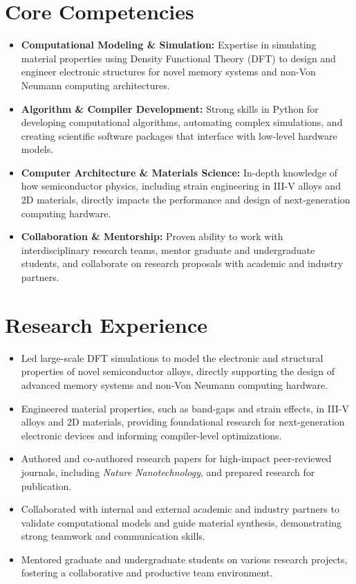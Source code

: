 \documentclass[letter,11pt]{article}
\begin{document}
\section{Core Competencies}
\begin{itemize}
    \item \textbf{Computational Modeling \& Simulation:} Expertise in simulating material properties using Density Functional Theory (DFT) to design and engineer electronic structures for novel memory systems and non-Von Neumann computing architectures.
    \item \textbf{Algorithm \& Compiler Development:} Strong skills in Python for developing computational algorithms, automating complex simulations, and creating scientific software packages that interface with low-level hardware models.
    \item \textbf{Computer Architecture \& Materials Science:} In-depth knowledge of how semiconductor physics, including strain engineering in III-V alloys and 2D materials, directly impacts the performance and design of next-generation computing hardware.
    \item \textbf{Collaboration \& Mentorship:} Proven ability to work with interdisciplinary research teams, mentor graduate and undergraduate students, and collaborate on research proposals with academic and industry partners.
\end{itemize}

\section{Research Experience}
\begin{itemize}
    \item Led large-scale DFT simulations to model the electronic and structural properties of novel semiconductor alloys, directly supporting the design of advanced memory systems and non-Von Neumann computing hardware.
    \item Engineered material properties, such as band-gaps and strain effects, in III-V alloys and 2D materials, providing foundational research for next-generation electronic devices and informing compiler-level optimizations.
    \item Authored and co-authored research papers for high-impact peer-reviewed journals, including \textit{Nature Nanotechnology}, and prepared research for publication.
    \item Collaborated with internal and external academic and industry partners to validate computational models and guide material synthesis, demonstrating strong teamwork and communication skills.
    \item Mentored graduate and undergraduate students on various research projects, fostering a collaborative and productive team environment.
\end{itemize}
\end{document}
